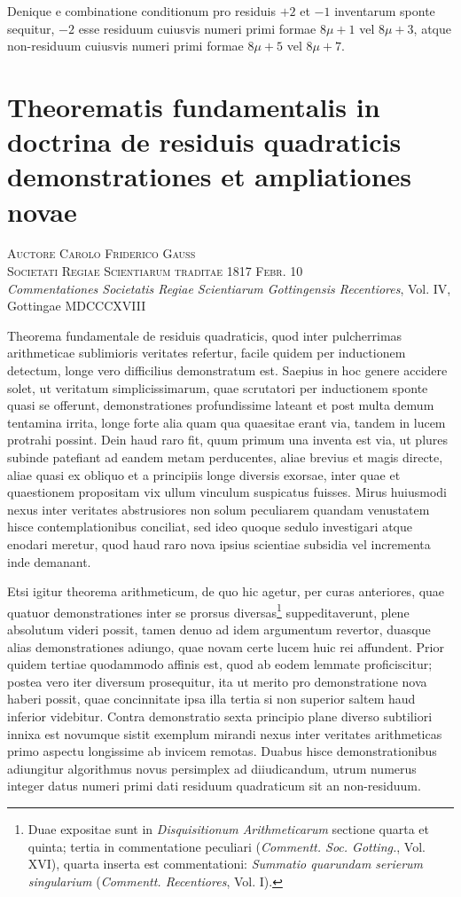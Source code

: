 \documentclass[12pt]{article}
\begin{document}
Denique e combinatione conditionum pro residuis $+2$ et $-1$ inventarum sponte sequitur, $-2$ esse residuum cuiusvis numeri primi formae $8\mu+1$ vel $8\mu+3$, atque non-residuum cuiusvis numeri primi formae $8\mu+5$ vel $8\mu+7$.



\section*{Theorematis fundamentalis in doctrina de residuis quadraticis demonstrationes et ampliationes novae}

\begin{center}
\textsc{Auctore Carolo Friderico Gauss}\\
\textsc{Societati Regiae Scientiarum traditae 1817 Febr. 10}\\[2pt]
\emph{Commentationes Societatis Regiae Scientiarum Gottingensis Recentiores}, Vol. IV, Gottingae MDCCCXVIII
\end{center}

Theorema fundamentale de residuis quadraticis, quod inter pulcherrimas arithmeticae sublimioris veritates refertur, facile quidem per inductionem detectum, longe vero difficilius demonstratum est. Saepius in hoc genere accidere solet, ut veritatum simplicissimarum, quae scrutatori per inductionem sponte quasi se offerunt, demonstrationes profundissime lateant et post multa demum tentamina irrita, longe forte alia quam qua quaesitae erant via, tandem in lucem protrahi possint. Dein haud raro fit, quum primum una inventa est via, ut plures subinde patefiant ad eandem metam perducentes, aliae brevius et magis directe, aliae quasi ex obliquo et a principiis longe diversis exorsae, inter quae et quaestionem propositam vix ullum vinculum suspicatus fuisses. Mirus huiusmodi nexus inter veritates abstrusiores non solum peculiarem quandam venustatem hisce contemplationibus conciliat, sed ideo quoque sedulo investigari atque enodari meretur, quod haud raro nova ipsius scientiae subsidia vel incrementa inde demanant.

Etsi igitur theorema arithmeticum, de quo hic agetur, per curas anteriores, quae quatuor demonstrationes inter se prorsus diversas\footnote{Duae expositae sunt in \emph{Disquisitionum Arithmeticarum} sectione quarta et quinta; tertia in commentatione peculiari (\emph{Commentt. Soc. Gotting.}, Vol. XVI), quarta inserta est commentationi: \emph{Summatio quarundam serierum singularium} (\emph{Commentt. Recentiores}, Vol. I).} suppeditaverunt, plene absolutum videri possit, tamen denuo ad idem argumentum revertor, duasque alias demonstrationes adiungo, quae novam certe lucem huic rei affundent. Prior quidem tertiae quodammodo affinis est, quod ab eodem lemmate proficiscitur; postea vero iter diversum prosequitur, ita ut merito pro demonstratione nova haberi possit, quae concinnitate ipsa illa tertia si non superior saltem haud inferior videbitur. Contra demonstratio sexta principio plane diverso subtiliori innixa est novumque sistit exemplum mirandi nexus inter veritates arithmeticas primo aspectu longissime ab invicem remotas. Duabus hisce demonstrationibus adiungitur algorithmus novus persimplex ad diiudicandum, utrum numerus integer datus numeri primi dati residuum quadraticum sit an non-residuum.
\end{document}
